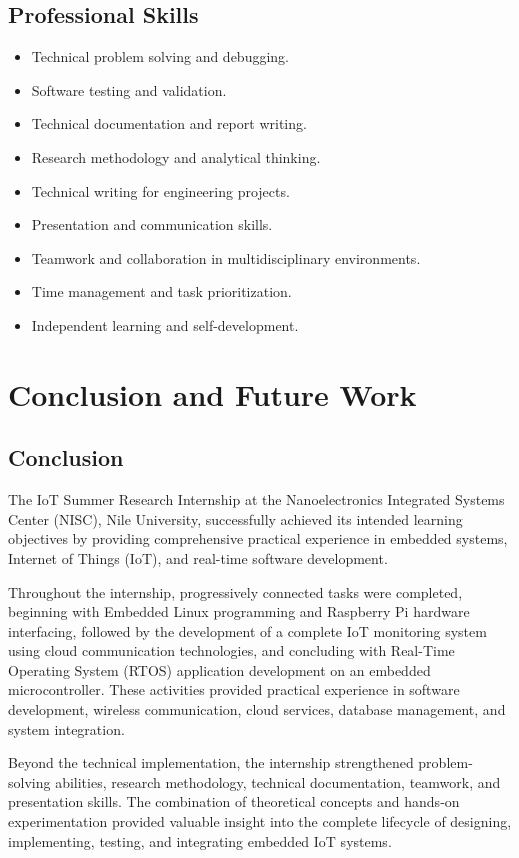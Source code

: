 \documentclass[conference]{IEEEtran}
\begin{document}
\subsection{Professional Skills}

\begin{itemize}
    \item Technical problem solving and debugging.
    \item Software testing and validation.
    \item Technical documentation and report writing.
    \item Research methodology and analytical thinking.
    \item Technical writing for engineering projects.
    \item Presentation and communication skills.
    \item Teamwork and collaboration in multidisciplinary environments.
    \item Time management and task prioritization.
    \item Independent learning and self-development.
\end{itemize}


\section{Conclusion and Future Work}

\subsection{Conclusion}

The IoT Summer Research Internship at the Nanoelectronics Integrated Systems Center (NISC), Nile University, successfully achieved its intended learning objectives by providing comprehensive practical experience in embedded systems, Internet of Things (IoT), and real-time software development.

Throughout the internship, progressively connected tasks were completed, beginning with Embedded Linux programming and Raspberry Pi hardware interfacing, followed by the development of a complete IoT monitoring system using cloud communication technologies, and concluding with Real-Time Operating System (RTOS) application development on an embedded microcontroller. These activities provided practical experience in software development, wireless communication, cloud services, database management, and system integration.

Beyond the technical implementation, the internship strengthened problem-solving abilities, research methodology, technical documentation, teamwork, and presentation skills. The combination of theoretical concepts and hands-on experimentation provided valuable insight into the complete lifecycle of designing, implementing, testing, and integrating embedded IoT systems.
\end{document}
